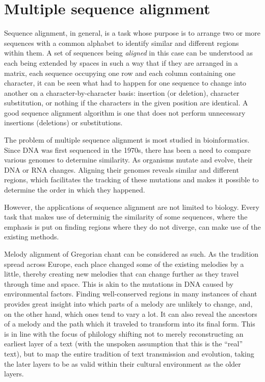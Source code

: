 \chapter{Multiple sequence alignment}

Sequence alignment, in general, is a task whose purpose is to arrange two or more sequences with a common alphabet to identify similar
and different regions within them. A set of sequences being \emph{aligned} in this case can be understood as each being extended by spaces
in such a way that if they are arranged in a matrix, each sequence occupying one row and each column containing one character, it can be seen
what had to happen for one sequence to change into another on a character-by-character basis: insertion (or deletion), character substitution,
or nothing if the characters in the given position are identical. A good sequence alignment algorithm is one that does not perform
unnecessary insertions (deletions) or substitutions.

The problem of multiple sequence alignment is most studied in bioinformatics. Since DNA was first sequenced
in the 1970s, there has been a need to compare various genomes to determine similarity. As organisms mutate and evolve, their
DNA or RNA changes. Aligning their genomes reveals similar and different regions, which facilitates the tracking of these
mutations and makes it possible to determine the order in which they happened.

However, the applications of sequence alignment are not limited to biology. Every task that makes use of determinig the similarity
of some sequences, where the emphasis is put on finding regions where they do not diverge, can make use of the existing methods.

Melody alignment of Gregorian chant can be considered as such. As the tradition spread across Europe, each place changed some of 
the existing melodies by a little, thereby creating new melodies that can change further as they travel through time and space.
This is akin to the mutations in DNA caused by environmental factors. Finding well-conserved regions in many instances of chant
provides great insight into which parts of a melody are unlikely to change, and, on the other hand, which ones tend to vary
a lot. It can also reveal the ancestors of a melody and the path which it traveled to transform into its final form.
This is in line with the focus of philology shifting not to merely reconstructing an earliest layer of a text (with the unspoken 
assumption that this is the ``real'' text), but to map the entire tradition of text transmission and evolution, taking the later layers 
to be as valid within their cultural environment as the older layers.


